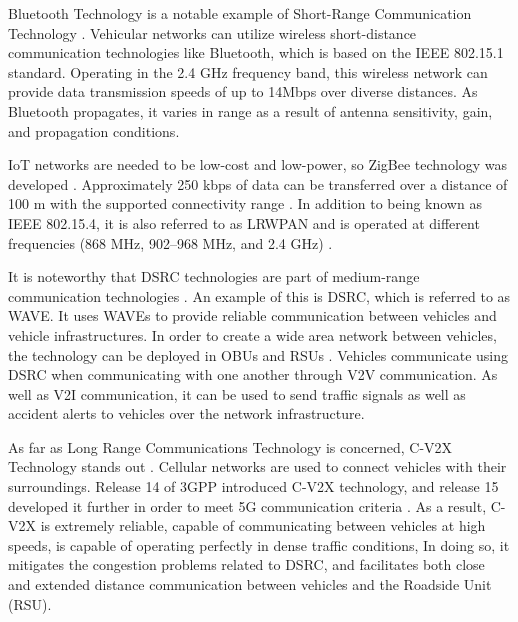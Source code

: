 \documentclass[a4paper,12pt]{article}
\begin{document}
\hspace{5mm} Bluetooth Technology is a notable example of Short-Range Communication Technology \cite{article24}. Vehicular networks can utilize wireless short-distance communication technologies like Bluetooth, which is based on the IEEE 802.15.1 standard. Operating in the 2.4 GHz frequency band, this wireless network can provide data transmission speeds of up to 14Mbps over diverse distances. As Bluetooth propagates, it varies in range as a result of antenna sensitivity, gain, and propagation conditions.\par

\hspace{5mm} IoT networks are needed to be low-cost and low-power, so ZigBee technology was developed \cite{article24}. Approximately 250 kbps of data can be transferred over a distance of 100 m with the supported connectivity range \cite{article24}. In addition to being known as IEEE 802.15.4, it is also referred to as LRWPAN and is operated at different frequencies (868 MHz, 902–968 MHz, and 2.4 GHz) \cite{article24}.\par

\hspace{5mm} It is noteworthy that DSRC technologies are part of medium-range communication technologies \cite{article24}. An example of this is DSRC, which is referred to as WAVE. It uses WAVEs to provide reliable communication between vehicles and vehicle infrastructures. In order to create a wide area network between vehicles, the technology can be deployed in OBUs and RSUs \cite{article24}. Vehicles communicate using DSRC when communicating with one another through V2V communication. As well as V2I communication, it can be used to send traffic signals as well as accident alerts to vehicles over the network infrastructure.

\hspace{5mm} As far as Long Range Communications Technology is concerned, C-V2X Technology stands out \cite{article24}. Cellular networks are used to connect vehicles with their surroundings. Release 14 of 3GPP introduced C-V2X technology, and release 15 developed it further in order to meet 5G communication criteria \cite{article24}.
As a result, C-V2X is extremely reliable, capable of communicating between vehicles at high speeds, is capable of operating perfectly in dense traffic conditions, In doing so, it mitigates the congestion problems related to DSRC, and facilitates both close and extended distance communication between vehicles and the Roadside Unit (RSU).
\end{document}
